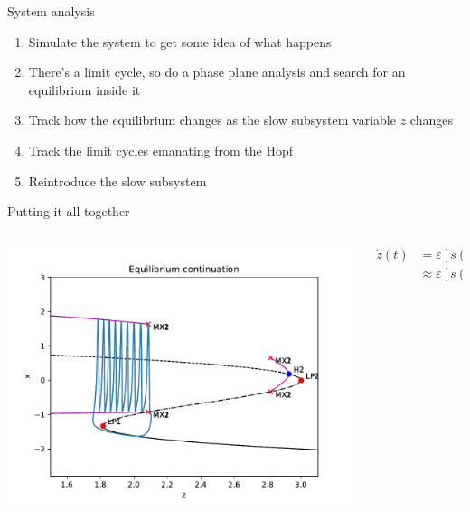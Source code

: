 \documentclass[presentation]{beamer}
\begin{document}
\begin{frame}[label={sec:orge12a2a8}]{System analysis}
\begin{enumerate}
\item Simulate the system to get some idea of what happens
\item There's a limit cycle, so do a phase plane analysis and search for an equilibrium inside it
\item Track how the equilibrium changes as the slow subsystem variable \(z\) changes
\item Track the limit cycles emanating from the Hopf
\item Reintroduce the slow subsystem
\end{enumerate}
\end{frame}

\begin{frame}[label={sec:org5055900}]{Putting it all together}
\begin{columns}
\begin{column}{0.65\columnwidth}
\begin{center}
\includegraphics[height=.85\textheight]{./burster_diagram.pdf}
\end{center}
\end{column}

\begin{column}{0.35\columnwidth}
\begin{align}
\dot{z}(t) &= \varepsilon\left[s(x(t)-x_r)-z(t)\right]\nonumber \\
&\approx \varepsilon\left[s(\bar{x} - x_r)-z(t)\right]\nonumber
\end{align}
\end{column}
\end{columns}
\end{frame}
\end{document}
